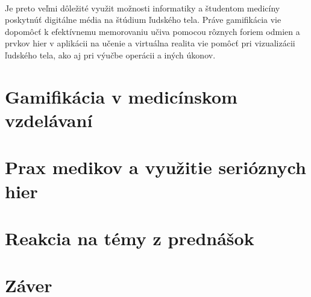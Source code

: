 \documentclass[10pt,twoside,slovak,a4paper]{article}
\begin{document}
\paragraph{}
Je preto veľmi dôležité využit možnosti informatiky a študentom medicíny poskytnúť digitálne média na štúdium ľudského tela. Práve gamifikácia vie dopomôcť k efektívnemu memorovaniu učiva pomocou rôznych foriem odmien a prvkov hier v aplikácii na učenie a virtuálna realita vie pomôcť pri vizualizácii ľudského tela, ako aj pri výučbe operácii a iných úkonov.



\section{Gamifikácia v medicínskom vzdelávaní} \label{druhacast}




\section{Prax medikov a využitie serióznych hier} \label{tretiacast}

\section{Reakcia na témy z prednášok} \label{prednasky}


\section{Záver} \label{zaver} %






\end{document}

